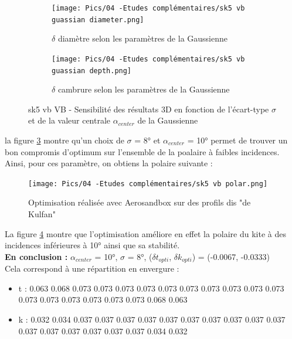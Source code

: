 \begin{figure}[H]
    \centering
    \begin{subfigure}[b]{0.45\textwidth}
        \centering
        \texttt{[image: Pics/04 -Etudes complémentaires/sk5 vb guassian diameter.png]}
        \caption{$\delta$ diamètre selon les paramètres de la Gaussienne}
        \label{fig:diametre gaussien sk5 vb}
    \end{subfigure}
    \hfill
    \begin{subfigure}[b]{0.45\textwidth}
        \centering
        \texttt{[image: Pics/04 -Etudes complémentaires/sk5 vb guassian depth.png]}
        \caption{$\delta$ cambrure selon les paramètres de la Gaussienne}
        \label{fig:cambrure gaussien sk5 vb}
    \end{subfigure}
    \caption{sk5 vb VB - Sensibilité des résultats 3D en fonction de l'écart-type $\sigma$ et de la valeur centrale $\alpha_{center}$ de la Gaussienne}
    \label{fig:gaussian sensibility sk5 vb}
\end{figure}

la figure \ref{fig:gaussian sensibility sk5 vb} montre qu'un choix de $\sigma$ = 8° et $\alpha_{center}$ = 10° permet de trouver un bon compromis d'optimum sur l'ensemble de la poalaire à faibles incidences. \\
Ainsi, pour ces paramètre, on obtiens la polaire suivante :\\

\begin{figure}[H]
    \centering
    \texttt{[image: Pics/04 -Etudes complémentaires/sk5 vb polar.png]}
    \caption{Optimisation réalisée avec Aerosandbox sur des profils dis "de Kulfan"}
    \label{fig:polar sk5 vb}
\end{figure}

La figure \ref{fig:polar sk5 vb} montre que l'optimisation améliore en effet la polaire du kite à des incidences inférieures à 10° ainsi que sa stabilité.\\
\textbf{En conclusion :} $\alpha_{center}$ = 10°, $\sigma$ = 8°, ($\delta t_{opti}$, $\delta k_{opti}$) = (-0.0067, -0.0333) \\

Cela correspond à une répartition en envergure :
\begin{itemize}
    \item t : 0.063 0.068 0.073 0.073 0.073 0.073 0.073 0.073 0.073 0.073 0.073 0.073 0.073 0.073 0.073 0.073 0.073 0.073 0.068 0.063
    \item k : 0.032 0.034 0.037 0.037 0.037 0.037 0.037 0.037 0.037 0.037 0.037 0.037 0.037 0.037 0.037 0.037 0.037 0.037 0.034 0.032
\end{itemize}

